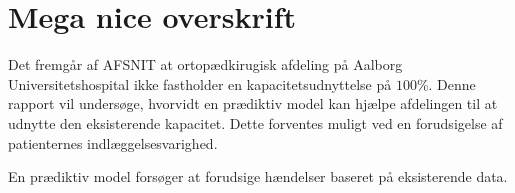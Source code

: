 \section{Mega nice overskrift}

Det fremgår af AFSNIT at ortopædkirugisk afdeling på Aalborg Universitetshospital ikke fastholder en kapacitetsudnyttelse på $100$\%. Denne rapport vil undersøge, hvorvidt en prædiktiv model kan hjælpe afdelingen til at udnytte den eksisterende kapacitet. Dette forventes muligt ved en forudsigelse af patienternes indlæggelsesvarighed. 

En prædiktiv model forsøger at forudsige hændelser baseret på eksisterende data.
